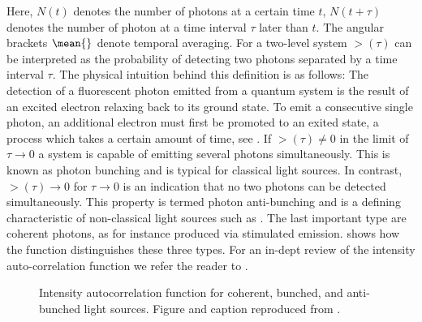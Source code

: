 		Here, $N(t)$ denotes the number of photons at a certain time $t$, $N(t+\tau)$ denotes the number of photon at a time interval $\tau$ later than $t$.
		The angular brackets $\mean{}$ denote temporal averaging.
		For a two-level system $\gt(\tau)$ can be interpreted as the probability of detecting two photons separated by a time interval $\tau$.
		The physical intuition behind this definition is as follows: The detection of a fluorescent photon emitted from a quantum system is the result of an excited electron relaxing back to its ground state. To emit a consecutive single photon, an additional electron must first be promoted to an exited state, a process which takes a certain amount of time, see . If $\gt(\tau) \neq 0$ in the limit of $\tau \to 0$ a system is capable of emitting several photons simultaneously. This is known as photon bunching and is typical for classical light sources. In contrast, $\gt(\tau) \to 0$ for $\tau \to 0$ is an indication that no two photons can be detected simultaneously. This property is termed photon anti-bunching and is a defining characteristic of non-classical light sources such as \sps. The last important type are coherent photons, as for instance produced via stimulated emission.  shows how the \gt function distinguishes these three types. For an in-dept review of the intensity auto-correlation function we refer the reader to \cite{Neu2012, Fox2006}.

		\begin{figure}[!htb]
			\centering
			\caption[Sketch of typical \gt functions]{Intensity autocorrelation function for coherent, bunched, and anti-bunched light sources. Figure and caption reproduced from \cite{rahbany2016towards}.}
			\label{fig::g2_illustration}
		\end{figure}


